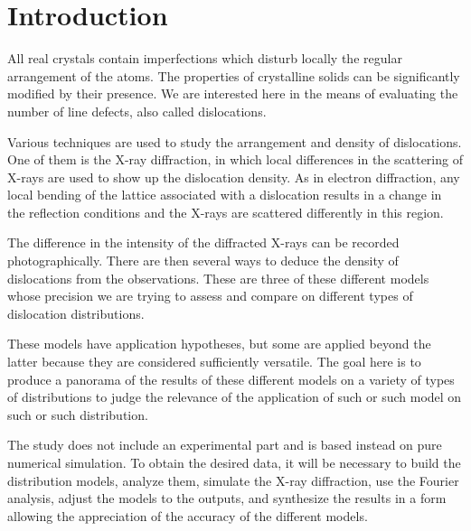 \section{Introduction}

All real crystals contain imperfections which disturb locally the regular arrangement of the atoms.
The properties of crystalline solids can be significantly modified by their presence.
We are interested here in the means of evaluating the number of line defects, also called dislocations.

\medskip

Various techniques are used to study the arrangement and density of dislocations.
One of them is the X-ray diffraction, in which local differences in the scattering of X-rays are used to show up the dislocation density.
As in electron diffraction, any local bending of the lattice associated with a dislocation results in a
change in the reflection conditions and the X-rays are scattered differently in this region.

\medskip

The difference in the intensity of the diffracted X-rays can be recorded photographically.
There are then several ways to deduce the density of dislocations from the observations.
These are three of these different models whose precision we are trying to assess and compare on different types of dislocation distributions.

\medskip

These models have application hypotheses, but some are applied beyond the latter because they are considered sufficiently versatile.
The goal here is to produce a panorama of the results of these different models on a variety of types of distributions to judge the relevance of the application of such or such model on such or such distribution.

\medskip

The study does not include an experimental part and is based instead on pure numerical simulation.
To obtain the desired data, it will be necessary to build the distribution models, analyze them, simulate the X-ray diffraction, use the Fourier analysis, adjust the models to the outputs, and synthesize the results in a form allowing the appreciation of the accuracy of the different models.
